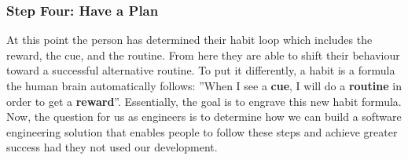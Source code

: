 \subsubsection*{Step Four: Have a Plan}
At this point the person has determined their habit loop which includes the reward, the cue, and the routine. From here they are able to shift their behaviour toward a successful alternative routine. To put it differently, a habit is a formula the human brain automatically follows: ”When I see a \textbf{cue}, I will do a \textbf{routine} in order to get a \textbf{reward}”. Essentially, the goal is to engrave this new habit formula. Now, the question for us as engineers is to determine how we can build a software engineering solution that enables people to follow these steps and achieve greater success had they not used our development.
